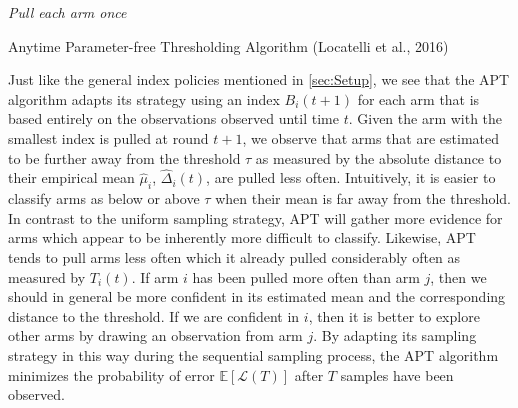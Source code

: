 \documentclass[12pt,]{article}
\begin{document}
\begin{algorithm}
\Input{$\tau$, $\epsilon$}
\BlankLine
\emph{Pull each arm once}\;
\caption{Anytime Parameter-free Thresholding Algorithm (Locatelli et al., 2016)}\label{alg:APT}
\end{algorithm}

\DecMargin{1em}

Just like the general index policies mentioned in \autoref{sec:Setup},
we see that the APT algorithm adapts its strategy using an index
\(B_i(t+1)\) for each arm that is based entirely on the observations
observed until time \(t\). Given the arm with the smallest index is
pulled at round \(t+1\), we observe that arms that are estimated to be
further away from the threshold \(\tau\) as measured by the absolute
distance to their empirical mean \(\hat{\mu}_i\), \(\hat{\Delta}_i(t)\),
are pulled less often. Intuitively, it is easier to classify arms as
below or above \(\tau\) when their mean is far away from the threshold.
In contrast to the uniform sampling strategy, APT will gather more
evidence for arms which appear to be inherently more difficult to
classify. Likewise, APT tends to pull arms less often which it already
pulled considerably often as measured by \(T_i(t)\). If arm \(i\) has
been pulled more often than arm \(j\), then we should in general be more
confident in its estimated mean and the corresponding distance to the
threshold. If we are confident in \(i\), then it is better to explore
other arms by drawing an observation from arm \(j\). By adapting its
sampling strategy in this way during the sequential sampling process,
the APT algorithm minimizes the probability of error
\(\mathbb{E}[\mathcal{L}(T)]\) after \(T\) samples have been observed.
\end{document}
